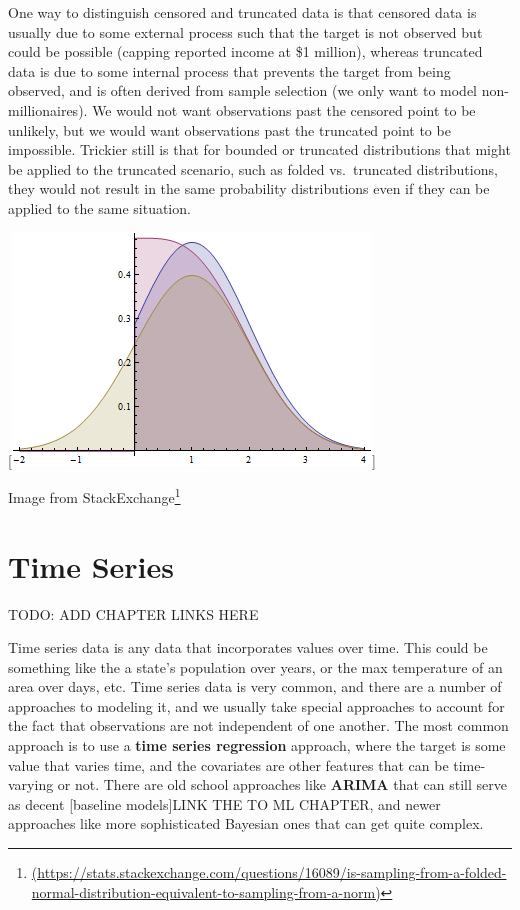 \documentclass[
  letterpaper,
]{krantz}
\DeclareRobustCommand{\href}[2]{#2\footnote{\url{#1}}}
\begin{document}
\begin{tcolorbox}[enhanced jigsaw, opacityback=0, leftrule=.75mm, bottomrule=.15mm, colframe=quarto-callout-note-color-frame, rightrule=.15mm, breakable, left=2mm, colback=white, arc=.35mm, toprule=.15mm]

One way to distinguish censored and truncated data is that censored data
is usually due to some external process such that the target is not
observed but could be possible (capping reported income at \$1 million),
whereas truncated data is due to some internal process that prevents the
target from being observed, and is often derived from sample selection
(we only want to model non-millionaires). We would not want observations
past the censored point to be unlikely, but we would want observations
past the truncated point to be impossible. Trickier still is that for
bounded or truncated distributions that might be applied to the
truncated scenario, such as folded vs.~truncated distributions, they
would not result in the same probability distributions even if they can
be applied to the same situation.

{[}\includegraphics{img/trunc_vs_folded.png}{]}

Image from
\href{(https://stats.stackexchange.com/questions/16089/is-sampling-from-a-folded-normal-distribution-equivalent-to-sampling-from-a-norm)}{StackExchange}

\end{tcolorbox}

\section{Time Series}\label{sec-data-time}

TODO: ADD CHAPTER LINKS HERE

Time series data is any data that incorporates values over time. This
could be something like the a state's population over years, or the max
temperature of an area over days, etc. Time series data is very common,
and there are a number of approaches to modeling it, and we usually take
special approaches to account for the fact that observations are not
independent of one another. The most common approach is to use a
\textbf{time series regression} approach, where the target is some value
that varies time, and the covariates are other features that can be
time-varying or not. There are old school approaches like \textbf{ARIMA}
that can still serve as decent {[}baseline models{]}LINK THE TO ML
CHAPTER, and newer approaches like more sophisticated Bayesian ones that
can get quite complex.
\end{document}
